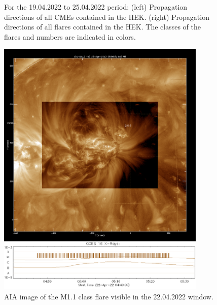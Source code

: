 \begin{figure}[H]
\begin{subfigure}{.47\textwidth}
        \end{subfigure}
        \caption{For the 19.04.2022 to 25.04.2022 period: (left) Propagation directions of all CMEs contained in the HEK. (right) Propagation directions of all flares contained in the HEK. The classes of the flares and numbers are indicated in colors.}
        \label{locator}
        \end{figure}

    \begin{figure}[H]
        \centering
        \includegraphics[width = 10cm]{report/Figures/results/aia_Mclass_2204.png}
        \caption{AIA image of the M1.1 class flare visible in the 22.04.2022 window.}
        \label{Mclass_flare}
    \end{figure}